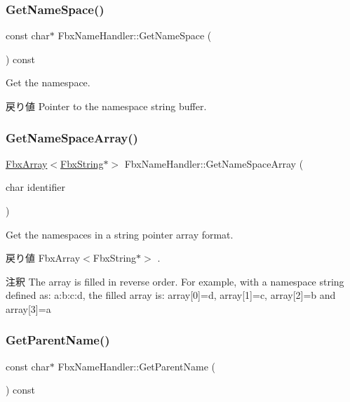 \subsubsection{\texorpdfstring{Get\+Name\+Space()}{GetNameSpace()}}
{\footnotesize\ttfamily const char$\ast$ Fbx\+Name\+Handler\+::\+Get\+Name\+Space (\begin{DoxyParamCaption}{ }\end{DoxyParamCaption}) const}

Get the namespace. \begin{DoxyReturn}{戻り値}
Pointer to the namespace string buffer. 
\end{DoxyReturn}
\mbox{\label{class_fbx_name_handler_a4dc170decc57489aad84077e7e3eb0dc}} 
\subsubsection{\texorpdfstring{Get\+Name\+Space\+Array()}{GetNameSpaceArray()}}
{\footnotesize\ttfamily \hyperlink{class_fbx_array}{Fbx\+Array}$<$\hyperlink{class_fbx_string}{Fbx\+String}$\ast$$>$ Fbx\+Name\+Handler\+::\+Get\+Name\+Space\+Array (\begin{DoxyParamCaption}\item[{char}]{identifier }\end{DoxyParamCaption})}

Get the namespaces in a string pointer array format. \begin{DoxyReturn}{戻り値}
Fbx\+Array$<$\+Fbx\+String$\ast$$>$ . 
\end{DoxyReturn}
\begin{DoxyRemark}{注釈}
The array is filled in reverse order. For example, with a namespace string defined as\+: a\+:b\+:c\+:d, the filled array is\+: array\mbox{[}0\mbox{]}=d, array\mbox{[}1\mbox{]}=c, array\mbox{[}2\mbox{]}=b and array\mbox{[}3\mbox{]}=a 
\end{DoxyRemark}
\mbox{\label{class_fbx_name_handler_a81b581d71cce2bc20c51ae16a95a8545}} 
\subsubsection{\texorpdfstring{Get\+Parent\+Name()}{GetParentName()}}
{\footnotesize\ttfamily const char$\ast$ Fbx\+Name\+Handler\+::\+Get\+Parent\+Name (\begin{DoxyParamCaption}{ }\end{DoxyParamCaption}) const}

